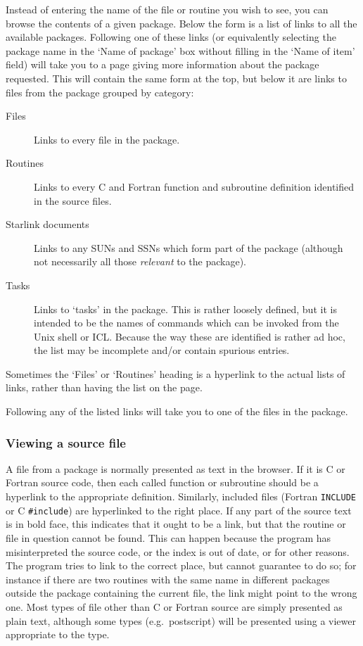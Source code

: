 \documentclass[twoside,11pt]{article}
\newcommand{\xlabel}[1]{}
\renewcommand{\_}{\texttt{\symbol{95}}}
\begin{document}
Instead of entering the name of the file or routine you wish to
see, you can browse the contents of a given package.
Below the form is a list of links to all the available packages.
Following one of these links (or equivalently selecting the package
name in the `Name of package' box without filling in the `Name of item'
field) will take you to a page giving more information about the 
package requested.
This will contain the same form at the top, 
but below it are links to files from the package grouped by category:
\begin{description}
\item[Files]
Links to every file in the package.
\item[Routines]
Links to every C and Fortran function and subroutine definition 
identified in the source files.
\item[Starlink documents]
Links to any SUNs and SSNs which form part of the package
(although not necessarily all those {\it relevant\/} to the package).
\item[Tasks]
Links to `tasks' in the package.
This is rather loosely defined, but it is intended to be
the names of commands which can be invoked from the Unix shell or ICL.
Because the way these are identified is rather ad hoc,
the list may be incomplete and/or contain spurious entries.
\end{description}
Sometimes the `Files' or `Routines' heading is a hyperlink to 
the actual lists of links, rather than having the list on the page.

Following any of the listed links 
will take you to one of the files in the package.

\subsubsection{\xlabel{sec:view}\label{sec:view}Viewing a source file}

A file from a package is normally presented as text in the browser.
If it is C or Fortran source code, then each called function or
subroutine should be a hyperlink to the appropriate definition.
Similarly, included files (Fortran {\tt INCLUDE} or C {\tt \#include}) 
are hyperlinked to the right place.
If any part of the source text is in bold face,
this indicates that it ought to be a link,
but that the routine or file in question cannot be found. 
This can happen because the program has misinterpreted the source code,
or the index is out of date, or for other reasons.
The program tries to link to the correct place, 
but cannot guarantee to do so; for instance if there are two 
routines with the same name in different packages outside the
package containing the current file, the link might point to
the wrong one.
Most types of file other than C or Fortran source are 
simply presented as plain text, although some types
(e.g.\ postscript)
will be presented using a viewer appropriate to the type.
\end{document}
